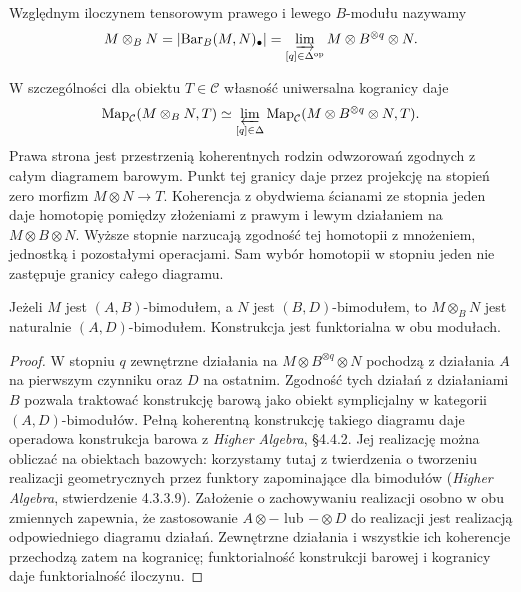 \begin{definicja}\label{cat:def:infty-relative-tensor}
Względnym iloczynem tensorowym prawego i lewego $B$-modułu nazywamy
\begin{equation}\label{cat:eq:infty-relative-tensor}
 M\otimes_B N=
 \left|\operatorname{Bar}_B(M,N)_\bullet\right|
 =\varinjlim_{[q]\in\Delta^{\mathrm{op}}}M\otimes B^{\otimes q}\otimes N.
\end{equation}
\end{definicja}

W szczególności dla obiektu $T\in\mathcal C$ własność uniwersalna kogranicy daje
\[
 \operatorname{Map}_{\mathcal C}(M\otimes_B N,T)
 \simeq\varprojlim_{[q]\in\Delta}
 \operatorname{Map}_{\mathcal C}(M\otimes B^{\otimes q}\otimes N,T).
\]
Prawa strona jest przestrzenią koherentnych rodzin odwzorowań zgodnych z całym diagramem barowym. Punkt tej granicy daje przez projekcję na stopień zero morfizm $M\otimes N\to T$. Koherencja z obydwiema ścianami ze stopnia jeden daje homotopię pomiędzy złożeniami z prawym i lewym działaniem na $M\otimes B\otimes N$. Wyższe stopnie narzucają zgodność tej homotopii z mnożeniem, jednostką i pozostałymi operacjami. Sam wybór homotopii w stopniu jeden nie zastępuje granicy całego diagramu.

\begin{stwierdzenie}\label{cat:prop:infty-bar-bimodule}
Jeżeli $M$ jest $(A,B)$-bimodułem, a $N$ jest $(B,D)$-bimodułem, to $M\otimes_B N$ jest naturalnie $(A,D)$-bimodułem. Konstrukcja jest funktorialna w obu modułach.
\end{stwierdzenie}
\begin{proof}
W stopniu $q$ zewnętrzne działania na $M\otimes B^{\otimes q}\otimes N$ pochodzą z działania $A$ na pierwszym czynniku oraz $D$ na ostatnim. Zgodność tych działań z działaniami $B$ pozwala traktować konstrukcję barową jako obiekt symplicjalny w kategorii $(A,D)$-bimodułów. Pełną koherentną konstrukcję takiego diagramu daje operadowa konstrukcja barowa z \emph{Higher Algebra}, \S4.4.2. Jej realizację można obliczać na obiektach bazowych: korzystamy tutaj z twierdzenia o tworzeniu realizacji geometrycznych przez funktory zapominające dla bimodułów (\emph{Higher Algebra}, stwierdzenie 4.3.3.9). Założenie o zachowywaniu realizacji osobno w obu zmiennych zapewnia, że zastosowanie $A\otimes-$ lub $-\otimes D$ do realizacji jest realizacją odpowiedniego diagramu działań. Zewnętrzne działania i wszystkie ich koherencje przechodzą zatem na kogranicę; funktorialność konstrukcji barowej i kogranicy daje funktorialność iloczynu.
\end{proof}

